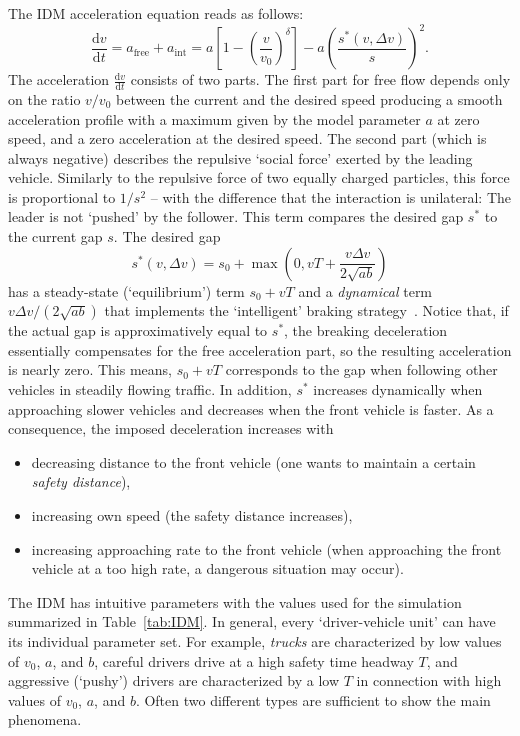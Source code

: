 \documentclass[paper=A4,pagesize=auto,11pt]{scrartcl}
\providecommand{\gquote}[1]{`#1'}
\newcommand{\D}{\text{d}}
\newcommand{\sub}[1]{_\text{#1}}
\providecommand{\abl}[2] {\frac{\D #1}{\D #2}}
\begin{document}
The  IDM acceleration equation reads as follows: 
\begin{equation}
\label{eq:IDM}
\abl{v}{t} = a\sub{free}+a\sub{int} = a \left[ 1 -\left(\frac{v}{v_0}
  \right)^{\delta}\right]  
     -a\left( \frac{s^*(v,\Delta v)} {s} \right)^2.
\end{equation}
%
The acceleration $\abl{v}{t}$ consists of two parts. The first part for free
flow depends only on the ratio $v/v_0$ between the current and the desired
speed producing a smooth acceleration profile with a maximum given
by the model parameter $a$ at zero speed, and a zero acceleration at the desired
speed. The second part (which is  always negative) describes the repulsive
\gquote{social force} exerted by the leading vehicle.  Similarly to
the repulsive force of two equally charged particles, this force is
proportional to $1/s^2$ -- with the difference
that the interaction is unilateral: The leader is not \gquote{pushed}
by the follower. This term  compares 
the desired gap  $s^*$ to the current gap $s$. The desired
gap
\begin{equation}\label{eq:IDM-sstar}
s^*(v,\Delta v)  = s_0  + \max \left(0, v T  + \frac{v \Delta v }
{2\sqrt{a b}}\right) 
\end{equation}
has a steady-state (\gquote{equilibrium}) term $s_0 + vT$ and a \textit{dynamical} term $v\Delta
v/(2\sqrt{ab})$ that implements the \gquote{intelligent} braking
strategy~\cite{TreiberKesting-Book}. 
Notice that, if the actual gap is approximatively equal to $s^*$, the
breaking deceleration essentially compensates for the free
acceleration part, so the resulting acceleration is nearly zero. This
means, $s_0+vT$ corresponds to the gap when following other vehicles
in steadily flowing traffic. In addition, $s^*$ increases dynamically
when approaching slower vehicles and decreases when the front vehicle
is faster. As a consequence, the imposed deceleration increases with 
\begin{itemize}
\item
decreasing distance to the front vehicle (one wants to maintain a certain \textit{safety distance}),
\item
increasing own speed (the safety distance increases),
\item
increasing approaching rate to the front vehicle (when approaching the front vehicle at a too high rate, a dangerous situation may occur). 
\end{itemize}
%
The IDM has intuitive parameters with the values used for the
simulation summarized in Table~\ref{tab:IDM}. In
general, every \gquote{driver-vehicle unit} can have its individual
parameter set. For example, \textit{trucks} are characterized by low
values of $v_0$, $a$, and $b$, careful drivers drive at a high safety
time headway $T$, and aggressive (\gquote{pushy}) drivers are
characterized by a low $T$ in connection with high values of $v_0$,
$a$, and $b$. Often two different types are sufficient to show the
main phenomena. 
\end{document}
